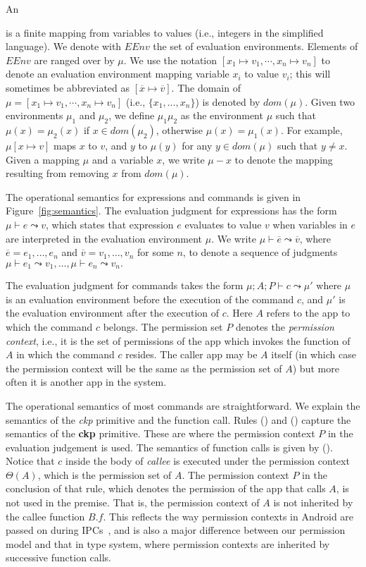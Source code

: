 An {
is a finite mapping from variables to values (i.e., integers in the simplified language).
We denote with $EEnv$ the set of evaluation environments.
Elements of $EEnv$ are ranged over by $\mu$.
We  use the notation
$[ x_1 \mapsto v_1, \cdots,  x_n \mapsto v_n]$
to denote an evaluation environment mapping variable $x_i$ to value $v_i$; this will sometimes be abbreviated as $[ \overline x \mapsto \overline v ].$
The domain of $\mu = [ x_1 \mapsto v_1, \cdots, x_n \mapsto v_n]$ (i.e., $\{x_1,\dots,x_n\}$) is denoted by $dom(\mu)$.
Given two environments $\mu_1$ and $\mu_2$, we define
$\mu_1\mu_2$ as the environment $\mu$ such that $\mu(x) = \mu_2(x)$ if $x \in dom(\mu_2)$,
otherwise $\mu(x) =\mu_1(x)$.
For example, $\mu[x \mapsto v]$ maps $x$ to $v$, and $y$ to $\mu(y)$
for any $y \in dom(\mu)$ such that $y \not = x.$
Given a mapping $\mu$ and a variable $x$, we write $\mu\!-\!x$ to denote the
mapping resulting from removing $x$ from $dom(\mu)$.

The operational semantics for expressions and commands is
given in Figure~\ref{fig:semantics}.
The evaluation judgment
for expressions has the form $\mu\vdash e\leadsto v$,
which states that expression $e$ evaluates to value $v$ when variables
in $e$ are interpreted in the evaluation environment $\mu.$
We write $\mu \vdash \overline{e} \leadsto \overline{v}$,
where $\overline{e}=e_1,\dots,e_n$ and $\overline{v} = v_1,\dots,v_n$ for some $n$,
to denote a sequence of judgments
$\mu \vdash e_1 \leadsto v_1, \ldots, \mu \vdash e_n \leadsto v_n.$

The evaluation judgment for commands takes the form
$\mu;A;P\vdash c \leadsto \mu'$
where $\mu$ is an evaluation environment before the execution
of the command $c$, and $\mu'$ is the evaluation environment
after the execution of $c$. Here $A$ refers to the app to which the command $c$ belongs.
The permission set $P$ denotes the {\em permission context}, i.e., it is the set of permissions of the app which invokes the function of $A$ in which the command $c$ resides. The caller
app may be $A$ itself (in which case the permission context will be the same as the permission set of $A$) but more often it is another app in the system.

The operational semantics of most commands are straightforward.
We explain the semantics of the \emph{ckp} primitive and the function call.
Rules () and () capture the semantics of the \textbf{ckp} primitive.
These are where the permission context $P$ in the evaluation judgement is used.
The semantics of function calls is given by (). 
 Notice that $c$ inside the body of \emph{callee} is executed under
the permission context $\Theta(A)$, which is the permission set of $A$. The permission context $P$
in the conclusion of that rule, which denotes the permission of the app that calls $A$, 
is not used in the premise. That is, the permission context of $A$ is not inherited by 
the callee function $B.f$. This reflects the way permission contexts in Android
are passed on during IPCs~\cite{Android-CheckPerm,Android-Binder-IPC}, and is also a major difference
between our permission model and that in {\BN} type system,
where permission contexts are inherited by successive function calls.

}
